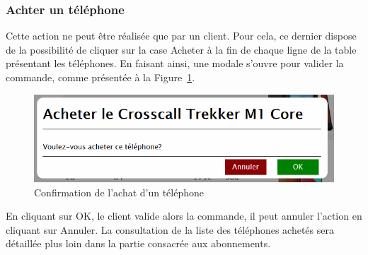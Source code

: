 \subsubsection{Achter un téléphone}
Cette action ne peut être réalisée que par un client. Pour cela, ce dernier dispose de la possibilité de cliquer sur la case \og Acheter\fg{} à la fin de chaque ligne de la table présentant les téléphones. En faisant ainsi, une modale s'ouvre pour valider la commande, comme présentée à la Figure~\ref{fig:achat-phone}.

\begin{figure}[ht]
  \centering
  \includegraphics[width=.6\textwidth]{images/Plateforme/buy_phone}
  \caption{Confirmation de l'achat d'un téléphone}
  \label{fig:achat-phone}
\end{figure}

En cliquant sur \og OK\fg, le client valide alors la commande, il peut annuler l'action en cliquant sur \og Annuler\fg. La consultation de la liste des téléphones achetés sera détaillée plus loin dans la partie consacrée aux abonnements.



